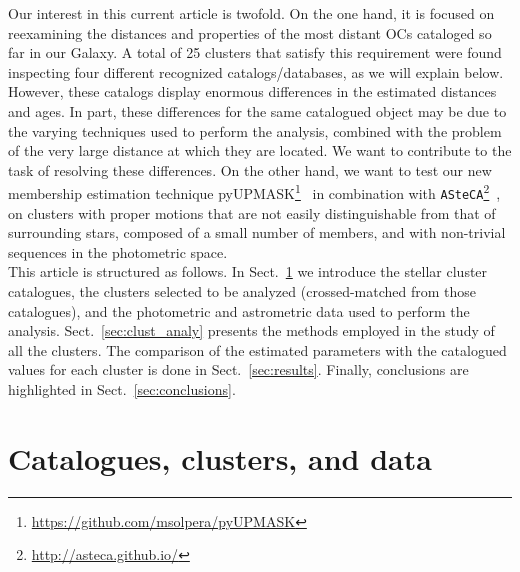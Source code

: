 \documentclass[draft]{aa}
\begin{document}
 Our interest in this current article is twofold. On the one hand, it is focused
 on reexamining the distances and properties of the most distant OCs cataloged
 so far in our Galaxy. A total of 25 clusters that satisfy this requirement were
 found inspecting four different recognized catalogs/databases, as we will
 explain below.
 However, these catalogs display enormous differences in the estimated distances
 and ages. In part, these differences for the same catalogued object may be due
 to the varying techniques used to perform the analysis, combined with
 the problem of the very large distance at which they are located.
 We want to contribute to the task of resolving these differences.
 On the other hand, we want to test our new membership estimation technique
 pyUPMASK\footnote{\url{https://github.com/msolpera/pyUPMASK}}~\citep{Pera_2021}
 in combination with
 \texttt{ASteCA}\footnote{\url{http://asteca.github.io/}}~\citep{Perren_2015},
 on clusters with proper motions that are not easily distinguishable from that
 of surrounding stars, composed of a small number of members, and with
 non-trivial sequences in the photometric space.\\


 This article is structured as follows. In Sect.~\ref{sec:cat_clust_data} we
 introduce the stellar cluster catalogues, the clusters selected to be
 analyzed (crossed-matched from those catalogues), and the photometric and
 astrometric data used to perform the analysis.
 Sect.~\ref{sec:clust_analy} presents the methods employed in the study of all the
 clusters. The comparison of the estimated parameters with the catalogued
 values for each cluster is done in Sect.~\ref{sec:results}. Finally,
 conclusions are highlighted in Sect.~\ref{sec:conclusions}.





\section{Catalogues, clusters, and data}
 \label{sec:cat_clust_data}
\end{document}
